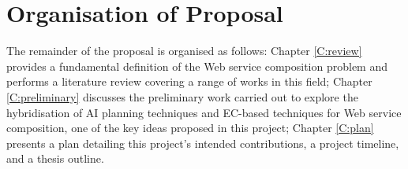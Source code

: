 \section{Organisation of Proposal}
The remainder of the proposal is organised as follows: Chapter \ref{C:review} provides a fundamental definition of the Web service composition problem and performs a literature review covering a range of works in this field; Chapter \ref{C:preliminary} discusses the preliminary work carried out to explore the hybridisation of AI planning techniques and EC-based techniques for Web service composition, one of the key ideas proposed in this project; Chapter \ref{C:plan} presents a plan detailing this project's intended contributions, a project timeline, and a thesis outline.

